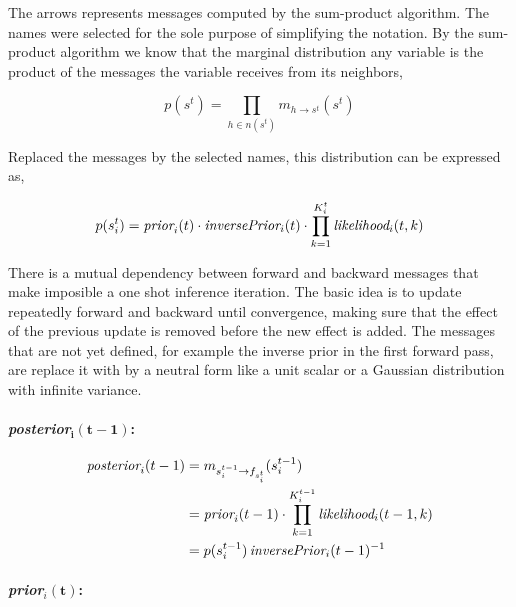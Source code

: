 \documentclass[article]{jss}
\begin{document}
The arrows represents messages computed by the sum-product algorithm.
The names were selected for the sole purpose of simplifying the notation.
By the sum-product algorithm we know that the marginal distribution any variable is the product of the messages the variable receives from its neighbors,

\begin{equation}
 p(s^t) = \prod_{h \in n(s^t)} m_{h \rightarrow s^t}(s^t)
\end{equation}

Replaced the messages by the selected names, this distribution can be expressed as, 

\begin{equation}
 p(s_i^t) = \emph{prior}_i(t) \cdot \emph{inversePrior}_i(t) \cdot \prod_{k=1}^{K_i^t} \emph{likelihood}_i(t,k)
\end{equation}

There is a mutual dependency between forward and backward messages that make imposible a one shot inference iteration.
The basic idea is to update repeatedly forward and backward until convergence, making sure that the effect of the previous update is removed before the new effect is added.
The messages that are not yet defined, for example the inverse prior in the first forward pass, are replace it with by a neutral form like a unit scalar or a Gaussian distribution with infinite variance.

\vspace{0.3cm}

\paragraph{\emph{posterior}$\bm{_i(t-1)}$:}

\begin{equation}
\begin{split}
  \emph{posterior}_i(t-1)&= m_{s_i^{t-1}\rightarrow f_{s_i^t}}(s_i^{t-1}) \\ 
 &= \emph{prior}_i(t-1) \cdot \prod_{k=1}^{K_i^{t-1}} \emph{likelihood}_i(t-1,k)\\
 &= p(s_i^{t-1}) \, \emph{inversePrior}_i(t-1)^{-1}
 \end{split}
\end{equation}

 
 \paragraph{\emph{prior}$_i\bm{(t)}$:}
 
\end{document}
